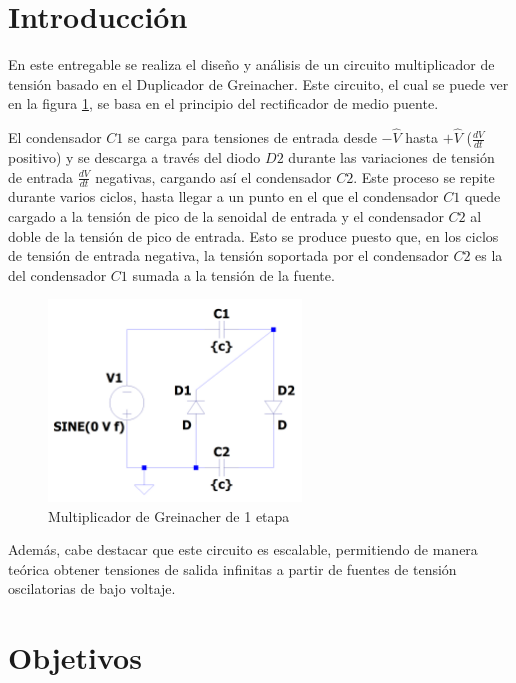 \section{Introducción}

En este entregable se realiza el diseño y análisis de un circuito multiplicador de tensión basado en el Duplicador de Greinacher.
Este circuito, el cual se puede ver en la figura \ref{fig_intro}, se basa en el principio del rectificador de medio puente.

El condensador $C1$ se carga para tensiones de entrada desde $-\hat{V}$ hasta $+\hat{V}$ ($\frac{dV}{dt}$ positivo) y
se descarga a través del diodo $D2$ durante las variaciones de tensión de entrada $\frac{dV}{dt}$ negativas, cargando así el condensador
$C2$. Este proceso se repite durante varios ciclos, hasta llegar a un punto en el que el condensador $C1$ quede cargado a la tensión de pico de la 
senoidal de entrada y el condensador $C2$ al doble de la tensión de pico de entrada. Esto se produce puesto que,
en los ciclos de tensión de entrada negativa, la tensión soportada por el condensador $C2$ es la del condensador $C1$ sumada a la tensión de la fuente.

\begin{figure}[H]
    \centering
    \includegraphics[width=0.6\textwidth]{Imagenes_alvaro/fig_intro.png}
    \caption{Multiplicador de Greinacher de 1 etapa}
    \label{fig_intro}
\end{figure}

Además, cabe destacar que este circuito es escalable, permitiendo de manera teórica obtener tensiones de salida infinitas a partir de fuentes de tensión
oscilatorias de bajo voltaje.

\section{Objetivos}

